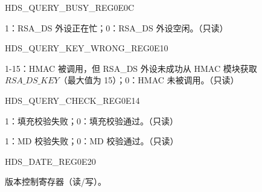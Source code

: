 \begin{register}{H}{DS\_QUERY\_BUSY\_REG}{\hexprefix{}0E0C}\label{regdesc:DSQUERYBUSYREG}
%
%
\regnewline%
\begin{regdesc}\begin{reglist}
\item [DS\_QUERY\_BUSY] 1：RSA\_DS 外设正在忙；0：RSA\_DS 外设空闲。（只读）
\end{reglist}\end{regdesc}
\end{register}



\begin{register}{H}{DS\_QUERY\_KEY\_WRONG\_REG}{\hexprefix{}0E10}\label{regdesc:DSQUERYKEYWRONGREG}
%
%
\regnewline%
\begin{regdesc}\begin{reglist}
\item [DS\_QUERY\_KEY\_WRONG] 1-15：HMAC 被调用，但 RSA\_DS 外设未成功从 HMAC 模块获取 \begin{math}RSA\_DS\_KEY\end{math}（最大值为 15）；0：HMAC 未被调用。（只读）
\end{reglist}\end{regdesc}
\end{register}




\begin{register}{H}{DS\_QUERY\_CHECK\_REG}{\hexprefix{}0E14}\label{regdesc:DSQUERYCHECKREG}
%
%
%
\regnewline%
\begin{regdesc}\begin{reglist}
\item [DS\_PADDING\_BAD] 1：填充校验失败；0：填充校验通过。（只读）
\item [DS\_MD\_ERROR] 1：MD 校验失败；0：MD 校验通过。（只读）
\end{reglist}\end{regdesc}
\end{register}




\begin{register}{H}{DS\_DATE\_REG}{\hexprefix{}0E20}\label{regdesc:DSDATEREG}
%
%
\regnewline%
\begin{regdesc}\begin{reglist}
\item [DS\_DATE] 版本控制寄存器（读/写）。
\end{reglist}\end{regdesc}
\end{register}
